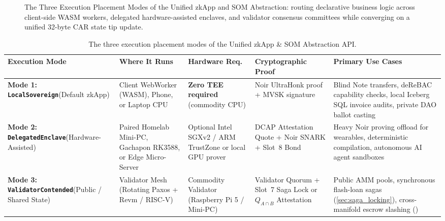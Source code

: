 \documentclass[a4paper,11pt,twoside,parskip=half-,headings=small]{scrartcl}
\newcommand{\code}[1]{\texttt{#1}}
\begin{document}
\begin{figure}[H]
\caption{The Three Execution Placement Modes of the Unified zkApp and SOM Abstraction: routing declarative business logic across client-side WASM workers, delegated hardware-assisted enclaves, and validator consensus committees while converging on a unified 32-byte CAR state tip update.}
\label{fig:zkapp_execution_modes}
\end{figure}

\begin{table}[H]
\centering\scriptsize
\renewcommand{\arraystretch}{1.3}
\begin{tabularx}{\linewidth}{@{}L{3.2cm} L{3.0cm} L{2.4cm} L{2.8cm} Y@{}}
\toprule
\textbf{Execution Mode} & \textbf{Where It Runs} & \textbf{Hardware Req.} & \textbf{Cryptographic Proof} & \textbf{Primary Use Cases}\\
\midrule
\textbf{Mode 1: \code{LocalSovereign}}\newline(Default zkApp) & Client WebWorker (WASM), Phone, or Laptop CPU & \textbf{Zero TEE required} (commodity CPU) & Noir UltraHonk proof + MVSK signature & Blind Note transfers, deReBAC capability checks, local Iceberg SQL invoice audits, private DAO ballot casting\\
\addlinespace[4pt]
\textbf{Mode 2: \code{DelegatedEnclave}}\newline(Hardware-Assisted) & Paired Homelab Mini-PC, Gachapon RK3588, or Edge Micro-Server & Optional Intel SGXv2 / ARM TrustZone or local GPU prover & DCAP Attestation Quote + Noir SNARK + Slot~8 Bond & Heavy Noir proving offload for wearables, deterministic compilation, autonomous AI agent sandboxes\\
\addlinespace[4pt]
\textbf{Mode 3: \code{ValidatorContended}}\newline(Public / Shared State) & Validator Mesh (Rotating Paxos + Revm / RISC-V) & Commodity Validator (Raspberry Pi 5 / Mini-PC) & Validator Quorum + Slot~7 Saga Lock or $Q_{A \cap B}$ Attestation & Public AMM pools, synchronous flash-loan sagas (\cref{sec:saga_locking}), cross-manifold escrow slashing ()\\
\bottomrule
\end{tabularx}
\caption{The three execution placement modes of the Unified zkApp \& SOM Abstraction API.}
\label{tab:zkapp_execution_modes}
\end{table}
\end{document}
